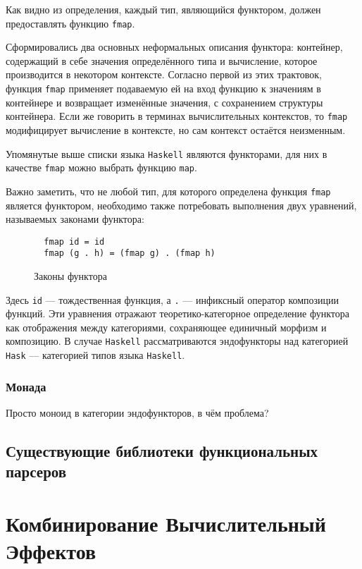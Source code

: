 Как видно из определения, каждый тип, являющийся функтором, должен предоставлять функцию \lstinline{fmap}.

Сформировались два основных неформальных описания функтора: контейнер, содержащий в себе значения определённого типа и вычисление, которое производится в некотором контексте. Согласно первой из этих трактовок, функция \lstinline{fmap} применяет подаваемую ей на вход функцию к значениям в контейнере и возвращает изменённые значения, с сохранением структуры контейнера. Если же говорить в терминах вычислительных контекстов, то \lstinline{fmap} модифицирует вычисление в контексте, но сам контекст остаётся неизменным.

Упомянутые выше списки языка \lstinline{Haskell} являются функторами, для них в качестве \lstinline{fmap} можно выбрать функцию \lstinline{map}. 

Важно заметить, что не любой тип, для которого определена функция \lstinline{fmap} является функтором, необходимо также потребовать выполнения двух уравнений, называемых законами функтора:

\begin{figure}[h]
\begin{lstlisting}
  fmap id = id
  fmap (g . h) = (fmap g) . (fmap h)
\end{lstlisting}
\caption{Законы функтора}
\label{listing:FunctorLaws}
\end{figure}

Здесь \lstinline{id} --- тождественная функция, а \lstinline{.} --- инфиксный оператор композиции функций. Эти уравнения отражают теоретико-категорное определение функтора как отображения между категориями, сохраняющее единичный морфизм и композицию. В случае \lstinline{Haskell} рассматриваются эндофункторы над категорией \lstinline{Hask} --- категорией типов языка \lstinline{Haskell}.  

\subsubsection{Монада}

Просто моноид в категории эндофункторов, в чём проблема?  

\subsection{Существующие библиотеки функциональных парсеров}

\section{Комбинирование Вычислительный Эффектов}

